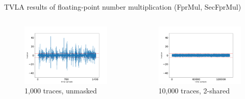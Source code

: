 \begin{frame}{TVLA results of floating-point number multiplication (FprMul, SecFprMul)}

\begin{columns}[T]
\begin{figure}
\includegraphics[width=\textwidth]{Figure/tvla-F4-CHES/fpr_mul_1k.png}
\vspace{-20pt}
\caption{1,000 traces, unmasked}
\end{figure}

\begin{figure}
\includegraphics[width=\textwidth]{figure/tvla-F4-CHES/SecFprMul_2shares_10k.png}
\vspace{-20pt}
\caption{10,000 traces, 2-shared}
\end{figure}


\end{columns}
\end{frame}
